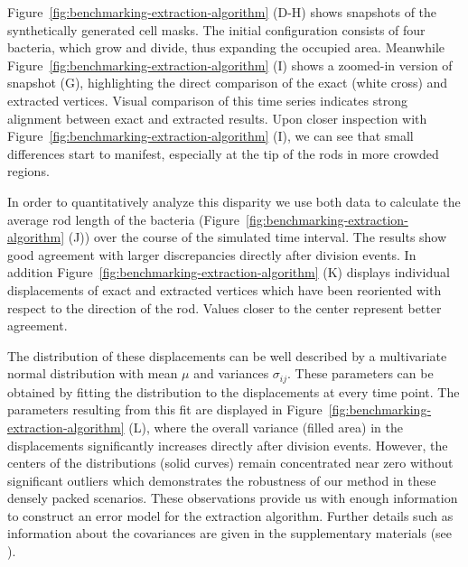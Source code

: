 \documentclass[10pt,letterpaper]{article}
\begin{document}
Figure~\ref{fig:benchmarking-extraction-algorithm} (D-H) shows snapshots of the synthetically
generated cell masks. The initial configuration consists of four bacteria, which grow and divide,
thus expanding the occupied area.
Meanwhile Figure~\ref{fig:benchmarking-extraction-algorithm} (I) shows a zoomed-in version of
snapshot (G), highlighting the direct comparison of the exact (white cross) and extracted vertices.
Visual comparison of this time series indicates strong alignment between exact and extracted
results.
Upon closer inspection with Figure~\ref{fig:benchmarking-extraction-algorithm} (I), we can see
that small differences start to manifest, especially at the tip of the rods in more crowded regions.

In order to quantitatively analyze this disparity we use both data to calculate the average rod
length of the bacteria (Figure~\ref{fig:benchmarking-extraction-algorithm} (J)) over the course of
the simulated time interval. The results show good agreement with larger discrepancies directly
after division events.
In addition Figure~\ref{fig:benchmarking-extraction-algorithm} (K) displays individual displacements
of exact and extracted vertices which have been reoriented with respect to the direction of the rod.
Values closer to the center represent better agreement.

The distribution of these displacements can be well described by a multivariate normal
distribution with mean $\mu$ and variances $\sigma_{ij}$.
These parameters can be obtained by fitting the distribution to the displacements at every time
point.
The parameters resulting from this fit are displayed in
Figure~\ref{fig:benchmarking-extraction-algorithm} (L), where the overall variance (filled area) in
the displacements significantly increases directly after division events.
However, the centers of the distributions (solid curves) remain concentrated near zero without
significant outliers which demonstrates the robustness of our method in these densely packed
scenarios.
These observations provide us with enough information to construct an error model for the extraction
algorithm.
Further details such as information about the covariances are given in the supplementary materials
(see ).
\end{document}
